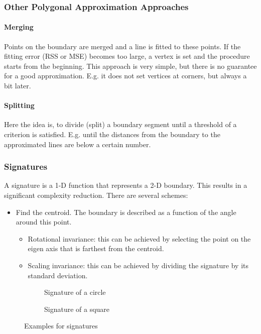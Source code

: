 \subsubsection{Other Polygonal Approximation Approaches}
\paragraph{Merging}
Points on the boundary are merged and a line is fitted to these points.
If the fitting error (RSS or MSE) becomes too large, a vertex is set and the procedure starts from the beginning.
This approach is very simple, but there is no guarantee for a good approximation.
E.g. it does not set vertices at corners, but always a bit later.

\paragraph{Splitting}
Here the idea is, to divide (split) a boundary segment until a threshold of a criterion is satisfied.
E.g. until the distances from the boundary to the approximated lines are below a certain number.

\subsubsection{Signatures}
A signature is a 1-D function that represents a 2-D boundary. This results in a significant complexity reduction. There are several schemes:\\
\begin{itemize}
\item Find the centroid. The boundary is described as a function of the angle around this point.
\begin{itemize}
\item Rotational invariance: this can be achieved by selecting the point on the eigen axis that is farthest from the centroid.
\item Scaling invariance: this can be achieved by dividing the signature by its standard deviation.
\end{itemize}
\end{itemize}
\begin{figure}[h]
	\begin{subfigure}{0.5\textwidth}
		\centering
		
		\caption{Signature of a circle}
	\end{subfigure}
	\begin{subfigure}{0.5\textwidth}
		\centering
		
		\caption{Signature of a square}
	\end{subfigure}
	\caption{Examples for signatures}
\end{figure}


